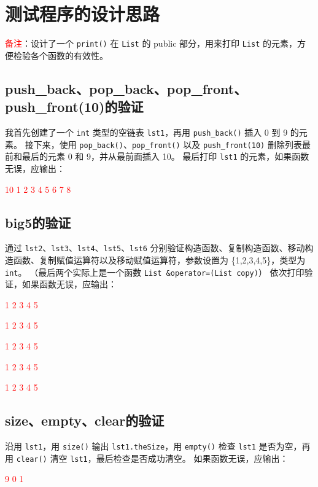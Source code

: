 \documentclass[UTF8]{ctexart}
\begin{document}
\pagestyle{fancy}
\fancyhead{}

\section{测试程序的设计思路}
\textcolor{red}{备注}：设计了一个 \texttt{print()} 在 \texttt{List} 的 public 部分，用来打印 \texttt{List} 的元素，方便检验各个函数的有效性。  

\subsection{push\_back、pop\_back、pop\_front、push\_front(10)的验证}
我首先创建了一个 \texttt{int} 类型的空链表 \texttt{lst1}，再用 \texttt{push\_back()} 插入 0 到 9 的元素。  
接下来，使用 \texttt{pop\_back()}、\texttt{pop\_front()} 以及 \texttt{push\_front(10)} 删除列表最前和最后的元素 0 和 9，并从最前面插入 10。  
最后打印 \texttt{lst1} 的元素，如果函数无误，应输出： 

\textcolor{red}{10 1 2 3 4 5 6 7 8}

\subsection{big5的验证}
通过 \texttt{lst2}、\texttt{lst3}、\texttt{lst4}、\texttt{lst5}、\texttt{lst6} 分别验证构造函数、复制构造函数、移动构造函数、复制赋值运算符以及移动赋值运算符，参数设置为 \{1,2,3,4,5\}，类型为 \texttt{int}。  
（最后两个实际上是一个函数 \texttt{List \&operator=(List copy)}）  
依次打印验证，如果函数无误，应输出：

\textcolor{red}{1 2 3 4 5} 

\textcolor{red}{1 2 3 4 5} 

\textcolor{red}{1 2 3 4 5} 

\textcolor{red}{1 2 3 4 5} 

\textcolor{red}{1 2 3 4 5}

\subsection{size、empty、clear的验证}
沿用 \texttt{lst1}，用 \texttt{size()} 输出 \texttt{lst1.theSize}，用 \texttt{empty()} 检查 \texttt{lst1} 是否为空，再用 \texttt{clear()} 清空 \texttt{lst1}，最后检查是否成功清空。  
如果函数无误，应输出： 

\textcolor{red}{9}  
\textcolor{red}{0}  
\textcolor{red}{1}
\end{document}
